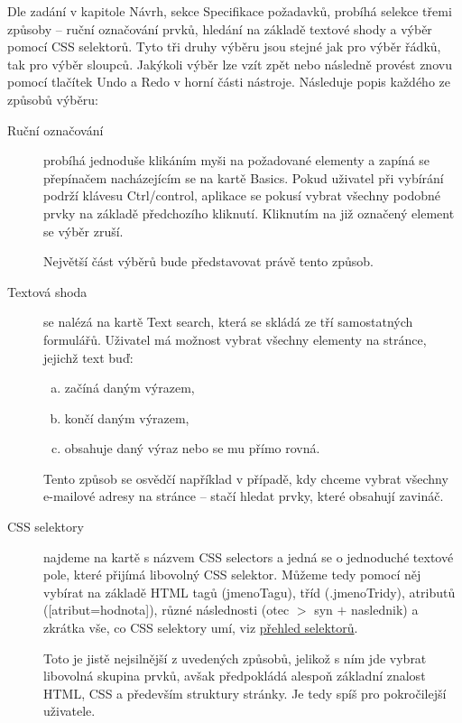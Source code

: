 \documentclass[thesis=B,czech]{FITthesis}[2012/06/26]
\begin{document}
Dle zadání v kapitole Návrh, sekce Specifikace požadavků, probíhá selekce třemi způsoby -- ruční označování prvků, hledání na základě textové shody a výběr pomocí CSS selektorů. Tyto tři druhy výběru jsou stejné jak pro výběr řádků, tak pro výběr sloupců. Jakýkoli výběr lze vzít zpět nebo následně provést znovu pomocí tlačítek \textsf{Undo} a \textsf{Redo} v horní části nástroje. Následuje popis každého ze způsobů výběru:
\begin{description}
	\item[Ruční označování] probíhá jednoduše klikáním myši na požadované elementy a zapíná se přepínačem nacházejícím se na kartě \textsf{Basics}. Pokud uživatel při vybírání podrží klávesu \textsf{Ctrl/control}, aplikace se pokusí vybrat všechny podobné prvky na základě předchozího kliknutí. Kliknutím na již označený element se výběr zruší.
	
	Největší část výběrů bude představovat právě tento způsob.
	\item [Textová shoda] se nalézá na kartě \textsf{Text search}, která se skládá ze tří samostatných formulářů. Uživatel má možnost vybrat všechny elementy na stránce, jejichž text buď:
	\begin{enumerate}[a)]
		\item začíná daným výrazem,
		\item končí daným výrazem,
		\item obsahuje daný výraz nebo se mu přímo rovná.
	\end{enumerate}
	Tento způsob se osvědčí například v případě, kdy chceme vybrat všechny e-mailové adresy na stránce -- stačí hledat prvky, které obsahují zavináč.
	\item [CSS selektory] najdeme na kartě s názvem \textsf{CSS selectors} a jedná se o jednoduché textové pole, které přijímá libovolný CSS selektor. Můžeme tedy pomocí něj vybírat na základě HTML tagů (\textsf{jmenoTagu}), tříd (\textsf{.jmenoTridy}), atributů (\textsf{[atribut=hodnota]}), různé následnosti (\textsf{otec $>$ syn $+$ naslednik}) a zkrátka vše, co CSS selektory umí, viz \href{https://www.w3schools.com/cssref/css_selectors.asp}{přehled selektorů}.
	
	Toto je jistě nejsilnější z uvedených způsobů, jelikož s ním jde vybrat libovolná skupina prvků, avšak předpokládá alespoň základní znalost HTML, CSS a především struktury stránky. Je tedy spíš pro pokročilejší uživatele.
\end{description}
\end{document}
